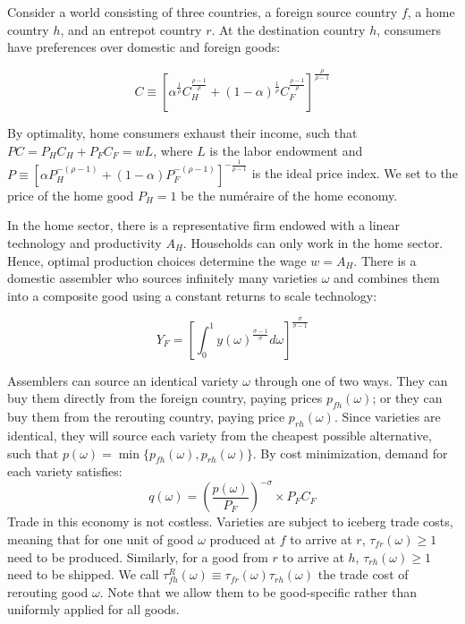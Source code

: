 Consider a world consisting of three countries, a foreign source country $f$, a home country $h$, and an entrepot country $r$. At the destination country $h$, consumers have preferences over domestic and foreign goods:

\begin{equation*}
    C \equiv \left[ \alpha^{\frac{1}{\rho}} C_H^{\frac{\rho - 1}{\rho}} + (1 - \alpha)^{\frac{1}{\rho}} C_F^{\frac{\rho - 1}{\rho}} \right]^{\frac{\rho}{\rho - 1}}
\end{equation*}

By optimality, home consumers exhaust their income, such that $PC = P_H C_H + P_F C_F = wL$, where $L$ is the labor endowment and $P \equiv [\alpha P_H^{-(\rho-1)} + (1-\alpha) P_F^{-(\rho-1)}]^{-\frac{1}{\rho-1}}$ is the ideal price index. We set to the price of the home good $P_H=1$ be the num\'eraire of the home economy.

In the home sector, there is a representative firm endowed with a linear technology and productivity $A_H$. Households can only work in the home sector. Hence, optimal production choices determine the wage $w = A_H$. There is a domestic assembler who sources infinitely many varieties $\omega$ and combines them into a composite good using a constant returns to scale technology:

\begin{equation*}
    Y_F = \left[ \int_0^1 y(\omega)^{\frac{\sigma-1}{\sigma}} d\omega \right]^\frac{\sigma}{\sigma-1}
\end{equation*}

Assemblers can source an identical variety $\omega$ through one of two ways. They can buy them directly from the foreign country, paying prices $p_{fh}(\omega)$; or they can buy them from the rerouting country, paying price $p_{rh}(\omega)$. Since varieties are identical, they will source each variety from the cheapest possible alternative, such that $p(\omega) = \min \{p_{fh}(\omega),p_{rh}(\omega) \}$. By cost minimization, demand for each variety satisfies:
\begin{equation}\label{eq: optimal-demand}
    q(\omega) = \left( \frac{p(\omega)}{P_F} \right)^{-\sigma} \times P_F C_F
\end{equation}
Trade in this economy is not costless. Varieties are subject to iceberg trade costs, meaning that for one unit of good $\omega$ produced at $f$ to arrive at $r$, $\tau_{fr}(\omega) \ge 1$ need to be produced. Similarly, for a good from $r$ to arrive at $h$, $\tau_{rh}(\omega) \ge 1$ need to be shipped. We call $\tau^R_{fh}(\omega) \equiv \tau_{fr}(\omega) \tau_{rh}(\omega)$ the trade cost of rerouting good $\omega$. Note that we allow them to be good-specific rather than uniformly applied for all goods.

